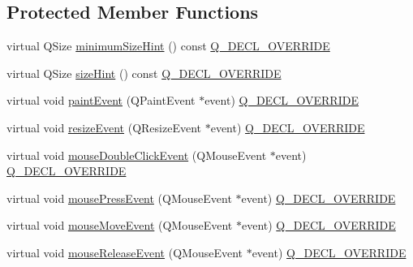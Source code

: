 \subsection*{Protected Member Functions}
\begin{DoxyCompactItemize}
\item 
virtual Q\+Size \mbox{\hyperlink{class_q_custom_plot_a968a01cd4077d63aecde1aef1db057fc}{minimum\+Size\+Hint}} () const \mbox{\hyperlink{qcustomplot_8h_a42cc5eaeb25b85f8b52d2a4b94c56f55}{Q\+\_\+\+D\+E\+C\+L\+\_\+\+O\+V\+E\+R\+R\+I\+DE}}
\item 
virtual Q\+Size \mbox{\hyperlink{class_q_custom_plot_ac9d6fe101e082daf756903b11f6e6213}{size\+Hint}} () const \mbox{\hyperlink{qcustomplot_8h_a42cc5eaeb25b85f8b52d2a4b94c56f55}{Q\+\_\+\+D\+E\+C\+L\+\_\+\+O\+V\+E\+R\+R\+I\+DE}}
\item 
virtual void \mbox{\hyperlink{class_q_custom_plot_a8068b368e5813065ee0f4cf7c6d21330}{paint\+Event}} (Q\+Paint\+Event $\ast$event) \mbox{\hyperlink{qcustomplot_8h_a42cc5eaeb25b85f8b52d2a4b94c56f55}{Q\+\_\+\+D\+E\+C\+L\+\_\+\+O\+V\+E\+R\+R\+I\+DE}}
\item 
virtual void \mbox{\hyperlink{class_q_custom_plot_af5b69dc6a431562ecdd1d0718bcbdf70}{resize\+Event}} (Q\+Resize\+Event $\ast$event) \mbox{\hyperlink{qcustomplot_8h_a42cc5eaeb25b85f8b52d2a4b94c56f55}{Q\+\_\+\+D\+E\+C\+L\+\_\+\+O\+V\+E\+R\+R\+I\+DE}}
\item 
virtual void \mbox{\hyperlink{class_q_custom_plot_a344075e6e80ed6d575c79b81694abb8a}{mouse\+Double\+Click\+Event}} (Q\+Mouse\+Event $\ast$event) \mbox{\hyperlink{qcustomplot_8h_a42cc5eaeb25b85f8b52d2a4b94c56f55}{Q\+\_\+\+D\+E\+C\+L\+\_\+\+O\+V\+E\+R\+R\+I\+DE}}
\item 
virtual void \mbox{\hyperlink{class_q_custom_plot_aac0a7296a6031dc667c01c1abd4ecc6b}{mouse\+Press\+Event}} (Q\+Mouse\+Event $\ast$event) \mbox{\hyperlink{qcustomplot_8h_a42cc5eaeb25b85f8b52d2a4b94c56f55}{Q\+\_\+\+D\+E\+C\+L\+\_\+\+O\+V\+E\+R\+R\+I\+DE}}
\item 
virtual void \mbox{\hyperlink{class_q_custom_plot_ae7abdc93b26d2ad4632c1ab75ae5b46f}{mouse\+Move\+Event}} (Q\+Mouse\+Event $\ast$event) \mbox{\hyperlink{qcustomplot_8h_a42cc5eaeb25b85f8b52d2a4b94c56f55}{Q\+\_\+\+D\+E\+C\+L\+\_\+\+O\+V\+E\+R\+R\+I\+DE}}
\item 
virtual void \mbox{\hyperlink{class_q_custom_plot_adc24846f52199e5a9bc35c387a6ce68d}{mouse\+Release\+Event}} (Q\+Mouse\+Event $\ast$event) \mbox{\hyperlink{qcustomplot_8h_a42cc5eaeb25b85f8b52d2a4b94c56f55}{Q\+\_\+\+D\+E\+C\+L\+\_\+\+O\+V\+E\+R\+R\+I\+DE}}

\end{DoxyCompactItemize}

